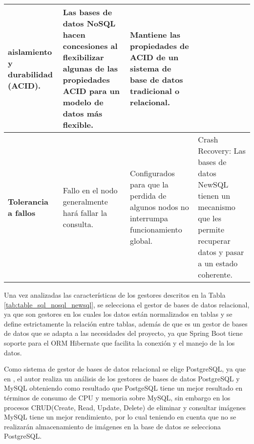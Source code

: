 \begin{footnotesize}
\begin{spacing}{1}
\begin{center}
\begin{longtable}[c]{ |>{\bfseries}p{}| p{}| p{}|  p{}|  }
            aislamiento y durabilidad
            (ACID). & Las bases de datos
            NoSQL hacen
            concesiones al
            flexibilizar algunas de las
            propiedades ACID para
            un modelo de datos más
            flexible.
            & Mantiene las propiedades
            de ACID de un sistema de
            base de datos tradicional o
            relacional. \\
            \hline
            Tolerancia a fallos & Fallo en el nodo generalmente
            hará fallar la consulta.
            & Configurados para que
            la perdida de algunos
            nodos no interrumpa
            funcionamiento global.
            & Crash Recovery: Las
            bases de datos NewSQL
            tienen un mecanismo
            que les permite recuperar
            datos y pasar a un estado
            coherente.\\
            \hline
        \end{longtable}

    \end{center}
\end{spacing}
\end{footnotesize}
\newpage
Una vez analizadas las características de los gestores descritos en la Tabla \ref{tab:table_sql_nosql_newsql}, se selecciona el gestor de bases de datos relacional, ya que son gestores en los cuales los datos están normalizados en tablas y se define estrictamente la relación entre tablas, además de que es un gestor de bases de datos que se adapta a las necesidades del proyecto, ya que Spring Boot tiene soporte para el ORM Hibernate que facilita la conexión y el manejo de la los datos.

\bigbreak

Como sistema de gestor de bases de datos relacional se elige PostgreSQL, ya que en \cite{leon_soberon_alisis_2020}, el autor realiza un análisis de los gestores de bases de datos PostgreSQL y MySQL obteniendo como resultado que PostgeSQL tiene un mejor resultado en términos de consumo de CPU y memoria sobre MySQL, sin embargo en los procesos CRUD(Create, Read, Update, Delete) de eliminar y consultar imágenes MySQL tiene un mejor rendimiento, por lo cual teniendo en cuenta que no se realizarán almacenamiento de imágenes en la base de datos se selecciona PostgreSQL.
